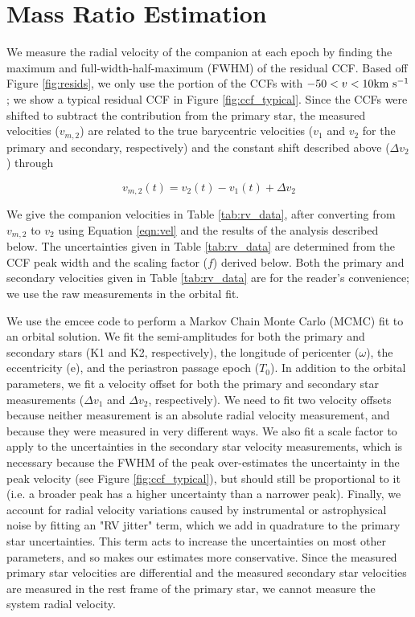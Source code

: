 \documentclass[twocolumn]{emulateapj}
\begin{document}
\section{Mass Ratio Estimation}
\label{sec:orbit}

We measure the radial velocity of the companion at each epoch by finding the maximum and full-width-half-maximum (FWHM) of the residual CCF. Based off Figure \ref{fig:resids}, we only use the portion of the CCFs with $-50 < v < 10 \rm km\ s^{-1}$; we show a typical residual CCF in Figure \ref{fig:ccf_typical}. Since the CCFs were shifted to subtract the contribution from the primary star, the measured velocities ($v_{m, 2}$) are related to the true barycentric velocities ($v_1$ and $v_2$ for the primary and secondary, respectively) and the constant shift described above ($\Delta v_2$) through

\begin{equation}
v_{m, 2}(t) = v_2(t) - v_1(t) + \Delta v_2
\label{eqn:vel}
\end{equation}

We give the companion velocities in Table \ref{tab:rv_data}, after converting from $v_{m, 2}$ to $v_2$ using Equation \ref{eqn:vel} and the results of the analysis described below. The uncertainties given in Table \ref{tab:rv_data} are determined from the CCF peak width and the scaling factor ($f$) derived below. Both the primary and secondary velocities given in Table \ref{tab:rv_data} are for the reader's convenience; we use the raw measurements in the orbital fit.

We use the emcee code \citep{emcee} to perform a Markov Chain Monte Carlo (MCMC) fit to an orbital solution. We fit the semi-amplitudes for both the primary and secondary stars (K1 and K2, respectively), the longitude of pericenter ($\omega$), the eccentricity (e), and the periastron passage epoch ($T_0$). In addition to the orbital parameters, we fit a velocity offset for both the primary and secondary star measurements ($\Delta v_1$ and $\Delta v_2$, respectively). We need to fit two velocity offsets because neither measurement is an absolute radial velocity measurement, and because they were measured in very different ways. We also fit a scale factor to apply to the uncertainties in the secondary star velocity measurements, which is necessary because the FWHM of the peak over-estimates the uncertainty in the peak velocity (see Figure \ref{fig:ccf_typical}), but should still be proportional to it (i.e. a broader peak has a higher uncertainty than a narrower peak). Finally, we account for radial velocity variations caused by instrumental or astrophysical noise by fitting an "RV jitter" term, which we add in quadrature to the primary star uncertainties. This term acts to increase the uncertainties on most other parameters, and so makes our estimates more conservative. Since the measured primary star velocities are differential and the measured secondary star velocities are measured in the rest frame of the primary star, we cannot measure the system radial velocity. 
\end{document}
